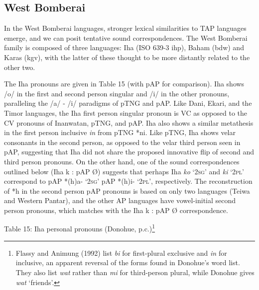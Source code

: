\subsection[West Bomberai ]{West Bomberai }
\hypertarget{RefHeading72088871885726}{}In the West Bomberai languages, stronger lexical similarities to TAP languages emerge, and we can posit tentative sound correspondences. The West Bomberai family is composed of three languages: Iha (ISO 639-3 ihp), Baham (bdw) and Karas (kgv), with the latter of these thought to be more distantly related to the other two.

The Iha pronouns are given in Table 15 (with pAP for comparison). Iha shows /o/ in the first and second person singular and /i/ in the other pronouns, paralleling the /a/ - /i/ paradigms of pTNG and pAP. Like Dani, Ekari, and the Timor languages, the Iha first person singular pronoun is VC as opposed to the CV pronouns of Inanwatan, pTNG, and pAP. Iha also shows a similar metathesis in the first person inclusive \textit{in} from pTNG *ni. Like pTNG, Iha shows velar consonants in the second person, as opposed to the velar third person seen in pAP, suggesting that Iha did not share the proposed innovative flip of second and third person pronouns. On the other hand, one of the sound correspondences outlined below (Iha k : pAP {\O}) suggests that perhaps Iha \textit{ko} {\textquoteleft}\textsc{2sg}{\textquoteright} and \textit{ki} {\textquoteleft}\textsc{2pl}{\textquoteright} correspond to pAP *(h)a- {\textquoteleft}\textsc{2sg}{\textquoteright} pAP *(h)i- {\textquoteleft}\textsc{2pl}{\textquoteright}, 
respectively. The reconstruction of *h in the second person pAP pronouns is based on only two languages (Teiwa and Western Pantar), and the other AP languages have vowel-initial second person pronouns, which matches with the Iha k : pAP {\O} correspondence. 

{\centering
Table 15: Iha personal pronouns (Donohue, p.c.)\footnote{ Flassy and Animung (1992) list \textit{bi} for first-plural exclusive and \textit{in} for inclusive, an apparent reversal of the forms found in Donohue{\textquoteright}s word list. They also list \textit{wat} rather than \textit{mi} for third-person plural, while Donohue gives \textit{wat} {\textquoteleft}friends{\textquoteright}.}
\par}

